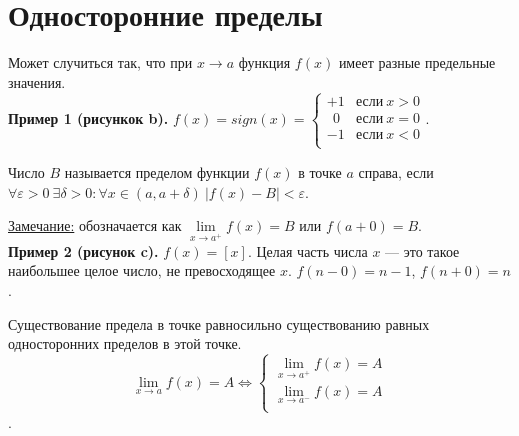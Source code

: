 \documentclass{article}
\begin{document}
    \section{Односторонние пределы}
    Может случиться так, что при \(x \to a\) функция \(f(x)\) имеет разные предельные значения.\\
    \textbf{Пример 1 (рисункок b).} \(f(x) = sign(x) = 
    \begin{cases}
        +1 & \text{если}\ x > 0\\
        \ \ 0 & \text{если}\ x = 0\\
        -1 & \text{если}\ x < 0\\ 
    \end{cases}\).
    \begin{definition}
        Число \(B\) называется пределом функции \(f(x)\) в точке \(a\) справа, если
        \(
            \forall \varepsilon > 0\ \exists \delta > 0 : \forall x \in (a, a + \delta)\ |f(x) - B| < \varepsilon
        \).
    \end{definition}
    \noindent
    \underline{Замечание:} обозначается как \(\lim\limits_{x \to a^{+}}f(x) = B\) или \(f(a + 0) = B\).\\ 
    \textbf{Пример 2 (рисунок c).} \(f(x) = [x]\). Целая часть числа \(x\)  --- это такое наибольшее целое число, не превосходящее \(x\).
    \(f(n - 0) = n - 1\), \(f(n + 0) = n\).
    \begin{theorem}
        Существование предела в точке равносильно существованию равных односторонних пределов в этой точке.\\
        \[\lim\limits_{x \to a}f(x) = A \iff 
        \begin{cases}
            \lim\limits_{x \to a^{+}}f(x) = A\\
            \lim\limits_{x \to a^{-}}f(x) = A\\
        \end{cases}\]. 
    \end{theorem}   
    
\end{document}
